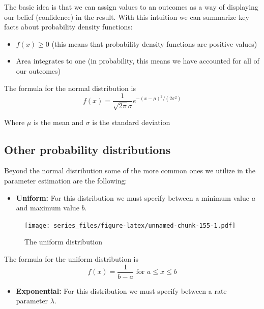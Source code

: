 \documentclass[
]{book}
\providecommand{\tightlist}{%
  \setlength{\itemsep}{0pt}\setlength{\parskip}{0pt}}
\theoremstyle{definition}
\theoremstyle{definition}
\theoremstyle{definition}
\theoremstyle{remark}
\begin{document}
The basic idea is that we can assign values to an outcomes as a way of displaying our belief (confidence) in the result. With this intuition we can summarize key facts about probability density functions:

\begin{itemize}
\tightlist
\item
  \(f(x) \geq 0\) (this means that probability density functions are positive values)
\item
  Area integrates to one (in probability, this means we have accounted for all of our outcomes)
\end{itemize}

The formula for the normal distribution is
\begin{equation}
f(x)=\frac{1}{\sqrt{2 \pi} \sigma } e^{-(x-\mu)^{2}/(2 \sigma^{2})}
\end{equation}

Where \(\mu\) is the mean and \(\sigma\) is the standard deviation

\hypertarget{other-probability-distributions}{%
\subsection{Other probability distributions}\label{other-probability-distributions}}

Beyond the normal distribution some of the more common ones we utilize in the parameter estimation are the following:

\begin{itemize}
\tightlist
\item
  \textbf{Uniform:} For this distribution we must specify between a minimum value \(a\) and maximum value \(b\).
\end{itemize}

\begin{figure}
\centering
\texttt{[image: series\_files/figure-latex/unnamed-chunk-155-1.pdf]}
\caption{\label{fig:unnamed-chunk-155}The uniform distribution}
\end{figure}

The formula for the uniform distribution is
\begin{equation}
f(x)=\frac{1}{b-a} \mbox{ for } a \leq x \leq b
\end{equation}

\begin{itemize}
\tightlist
\item
  \textbf{Exponential:} For this distribution we must specify between a rate parameter \(\lambda\).
\end{itemize}
\end{document}
